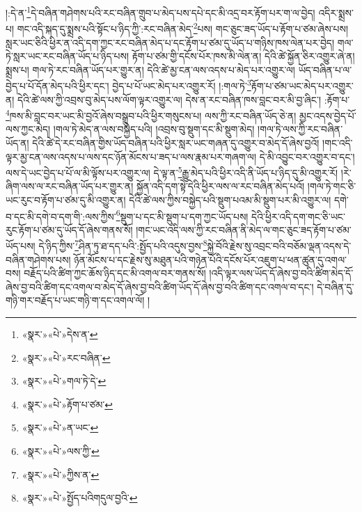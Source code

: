 །:དེ་ན་\footnote{«སྣར་»«པེ་»དེས་ན་}དེ་བཞིན་གཤེགས་པའི་རང་བཞིན་གྲུབ་པ་མེད་པས་དཔེ་དང་མི་འདྲ་བར་རྟོག་པར་ག་ལ་བྱེད། འདིར་སྨྲས་པ། གང་འདི་སྐད་དུ་སྨྲས་པའི་སྟོང་པ་ཉིད་ཀྱི་:རང་བཞིན་མེད་\footnote{«སྣར་»«པེ་»རང་བཞིན་}པས། གང་ཅུང་ཟད་ཡོད་པ་རྟོག་པ་ཙམ་ཞེས་པས། སླར་ཡང་ཅིའི་ཕྱིར་ན་འདི་དག་ཀྱང་རང་བཞིན་མེད་པ་དང་རྟོག་པ་ཙམ་དུ་ཡོད་པ་གཉིས་ཁས་ལེན་པར་བྱེད། གལ་ཏེ་སླར་ཡང་རང་བཞིན་ཡོད་པ་ཉིད་པས། རྟོག་པ་ཙམ་གྱི་དངོས་པོར་ཁས་མི་ལེན་ན། དེའི་ཚེ་སྐྱོན་ཅིར་འགྱུར་ཞེ་ན། སྨྲས་པ། གལ་ཏེ་རང་བཞིན་ཡོད་པར་གྱུར་ན། དེའི་ཚེ་མྱ་ངན་ལས་འདས་པ་མེད་པར་འགྱུར་ལ། ཡོད་བཞིན་པ་ལ་བྱེད་པ་པོ་དོན་མེད་པའི་ཕྱིར་དང་། བྱེད་པ་པོ་ཡང་མེད་པར་འགྱུར་རོ། །:གལ་ཏེ་\footnote{«སྣར་»«པེ་»གལ་ཏེ་དེ་}རྟོག་པ་ཙམ་ཡང་མེད་པར་འགྱུར་ན། དེའི་ཚེ་ལས་ཀྱི་འབྲས་བུ་མེད་པས་ལོག་ལྟར་འགྱུར་ལ། དེས་ན་རང་བཞིན་ཁས་བླང་བར་མི་བྱ་ཞིང་། :རྟོག་པ་\footnote{«སྣར་»«པེ་»རྟོག་པ་ཙམ་}ཁས་མི་བླང་བར་ཡང་མི་བྱའོ་ཞེས་བསྒྲུབ་པའི་ཕྱིར་གསུངས་པ། ལས་ཀྱི་རང་བཞིན་ཡོད་ཅེ་ན། མྱང་འདས་བྱེད་པོ་ལས་ཀྱང་མེད། །གལ་ཏེ་མེད་ན་ལས་བསྐྱེད་པའི། །འབྲས་བུ་སྡུག་དང་མི་སྡུག་མེད། །གལ་ཏེ་ལས་ཀྱི་རང་བཞིན་ཡོད་ན། དེའི་ཚེ་དེ་རང་བཞིན་གྱིས་ཡོད་བཞིན་པའི་ཕྱིར་སླར་ཡང་གཞན་དུ་འགྱུར་བ་མེད་དོ་ཞེས་བྱའོ། །གང་འདི་ལྟར་མྱ་ངན་ལས་འདས་པ་ལས་དང་ཉོན་མོངས་པ་ཟད་པ་ལས་རྣམ་པར་གཞག་ལ། དེ་མི་འབྱུང་བར་འགྱུར་བ་དང་། ལས་དེ་ཡང་བྱེད་པ་པོ་ལ་མི་ལྟོས་པར་འགྱུར་ལ། དེ་ལྟ་ན་\footnote{«སྣར་»«པེ་»ན་ཡང་}རྒྱུ་མེད་པའི་ཕྱིར་འདི་ནི་ཡོད་པ་ཉིད་དུ་མི་འགྱུར་རོ། །རེ་ཞིག་ལས་ལ་རང་བཞིན་ཡོད་པར་གྱུར་ན། སྐྱོན་འདི་དག་སྟེ་དེའི་ཕྱིར་ལས་ལ་རང་བཞིན་མེད་པའོ། །གལ་ཏེ་གང་ཅི་ཡང་རུང་བ་རྟོག་པ་ཙམ་དུ་མི་འགྱུར་ན། དེའི་ཚེ་ལས་ཀྱིས་བསྐྱེད་པའི་སྡུག་པའམ་མི་སྡུག་པར་མི་འགྱུར་ལ། དགེ་བ་དང་མི་དགེ་བ་དག་གི་:ལས་ཀྱིས་\footnote{«སྣར་»«པེ་»ལས་ཀྱི་}སྡུག་པ་དང་མི་སྡུག་པ་དག་ཀྱང་ཡོད་པས། དེའི་ཕྱིར་འདི་དག་གང་ཅི་ཡང་རུང་རྟོག་པ་ཙམ་དུ་ཡོད་དོ་ཞེས་གནས་སོ། །གང་ཡང་འདི་ལས་ཀྱི་རང་བཞིན་ནི་མེད་ལ་གང་ཅུང་ཟད་རྟོག་པ་ཙམ་ཡོད་པས། དེ་ཉིད་ཀྱིས་\footnote{«སྣར་»«པེ་»ཀྱིས་ན་}ཤིན་ཏུ་ཐ་དད་པའི་:སྤྱོད་པའི་འདུས་བྱས་\footnote{«སྣར་»«པེ་»སྤྱོད་པའིགདུལ་བྱའི་}སྐྱེ་བོའི་རྗེས་སུ་འབྲང་བའི་བཅོམ་ལྡན་འདས་དེ་བཞིན་གཤེགས་པས། ཉོན་མོངས་པ་དང་རྗེས་སུ་མཐུན་པའི་གཉེན་པོའི་དངོས་པོར་འཇུག་པ་ཕན་ཚུན་དུ་འགལ་བས། བརྗོད་པའི་ཚིག་ཀྱང་ཆོས་ཉིད་དང་མི་འགལ་བར་གནས་སོ། །འདི་ལྟར་ལས་ཡོད་དོ་ཞེས་བྱ་བའི་ཚིག་མེད་དོ་ཞེས་བྱ་བའི་ཚིག་དང་འགལ་བ་མེད་དོ་ཞེས་བྱ་བའི་ཚིག་ཡོད་དོ་ཞེས་བྱ་བའི་ཚིག་དང་འགལ་བ་དང་། དེ་བཞིན་དུ་གཉི་གར་བརྗོད་པ་ཡང་གཉི་ག་དང་འགལ་ལོ། །
